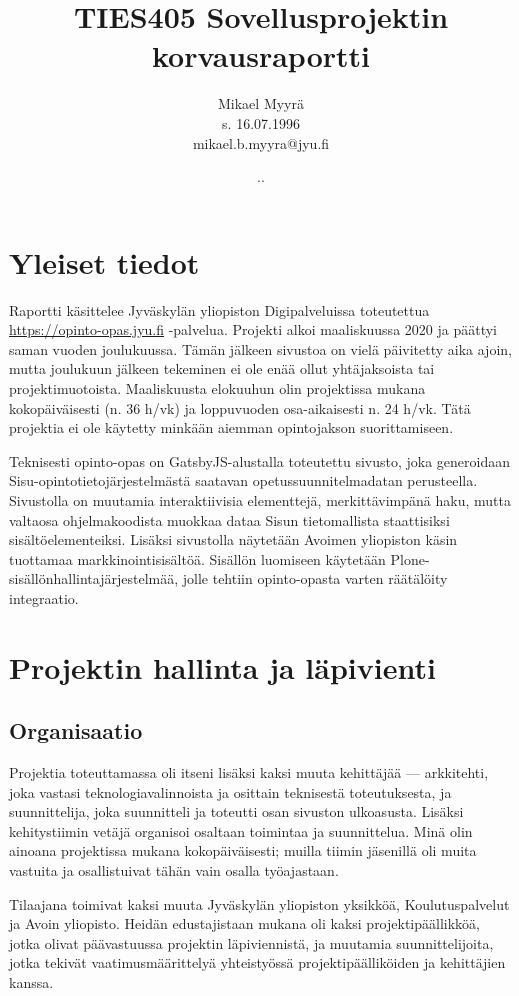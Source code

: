 \documentclass{article}
\title{TIES405 Sovellusprojektin korvausraportti}
\author{
Mikael Myyrä \\
s. 16.07.1996\\
mikael.b.myyra@jyu.fi\\
}
\date{\number\day.\number\month.\number\year}
\begin{document}
\maketitle

\section{Yleiset tiedot}

Raportti käsittelee Jyväskylän yliopiston Digipalveluissa toteutettua
\url{https://opinto-opas.jyu.fi} -palvelua.  Projekti alkoi maaliskuussa 2020
ja päättyi saman vuoden joulukuussa. Tämän jälkeen sivustoa on vielä päivitetty
aika ajoin, mutta joulukuun jälkeen tekeminen ei ole enää ollut yhtäjaksoista
tai projektimuotoista. Maaliskuusta elokuuhun olin projektissa mukana
kokopäiväisesti (n. 36 h/vk) ja loppuvuoden osa-aikaisesti n. 24 h/vk. Tätä
projektia ei ole käytetty minkään aiemman opintojakson suorittamiseen.

Teknisesti opinto-opas on GatsbyJS-alustalla toteutettu sivusto, joka
generoidaan Sisu-opintotieto\-järjestelmästä saatavan opetussuunnitelmadatan
perusteella. Sivustolla on muutamia interaktiivisia elementtejä,
merkittävimpänä haku, mutta valtaosa ohjelmakoodista muokkaa dataa Sisun
tieto\-mallista staattisiksi sisältöelementeiksi. Lisäksi sivustolla näytetään
Avoimen yliopiston käsin tuottamaa markkinointisisältöä. Sisällön luomiseen
käytetään Plone-sisällönhallintajärjestelmää, jolle tehtiin opinto-opasta varten
räätälöity integraatio.

\section{Projektin hallinta ja läpivienti}

\subsection{Organisaatio}

Projektia toteuttamassa oli itseni lisäksi kaksi muuta kehittäjää — arkkitehti,
joka vastasi teknologiavalinnoista ja osittain teknisestä toteutuksesta,
ja suunnittelija, joka suunnitteli ja toteutti osan sivuston ulkoasusta.
Lisäksi kehitystiimin vetäjä organisoi osaltaan toimintaa ja suunnittelua.
Minä olin ainoana projektissa mukana kokopäiväisesti; muilla tiimin jäsenillä
oli muita vastuita ja osallistuivat tähän vain osalla työajastaan.

Tilaajana toimivat kaksi muuta Jyväskylän yliopiston yksikköä,
Koulutuspalvelut ja Avoin yliopisto. Heidän edustajistaan mukana oli kaksi
projektipäällikköä, jotka olivat päävastuussa projektin läpiviennistä, ja
muutamia suunnittelijoita, jotka tekivät vaatimusmäärittelyä yhteistyössä
projektipäälliköiden ja kehittäjien kanssa.
\end{document}
